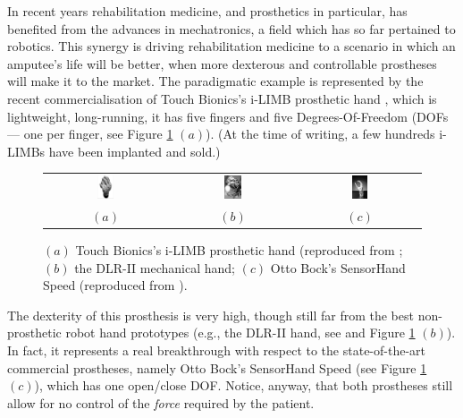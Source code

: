In recent years rehabilitation medicine, and prosthetics in
particular, has benefited from the advances in mechatronics, a field
which has so far pertained to robotics. This synergy is driving
rehabilitation medicine to a scenario in which an amputee's life will
be better, when more dexterous and controllable prostheses will make
it to the market. The paradigmatic example is represented by the
recent commercialisation of Touch Bionics's i-LIMB prosthetic hand
\cite{ilimb}, which is lightweight, long-running, it has five fingers
and five Degrees-Of-Freedom (DOFs --- one per finger, see Figure
\ref{fig:hands} $(a)$). (At the time of writing, a few hundreds i-LIMBs
have been implanted and sold.)

\begin{figure}
  \begin{tabular}{ccc}
    \includegraphics[width=0.14\textwidth]{hands_TB.eps} &
    \includegraphics[width=0.14\textwidth]{hands_DLRII.eps} &
    \includegraphics[width=0.14\textwidth]{hands_OB.eps} \\
    $(a)$ & $(b)$ & $(c)$
  \end{tabular}
  \caption{$(a)$ Touch Bionics's i-LIMB prosthetic hand (reproduced
    from \cite{ilimb}; $(b)$ the DLR-II mechanical hand; $(c)$ Otto
    Bock's SensorHand Speed (reproduced from \cite{sensorhand}).}
  \label{fig:hands}
\end{figure}

The dexterity of this prosthesis is very high, though still far from
the best non-prosthetic robot hand prototypes (e.g., the DLR-II hand,
see \cite{Hua2006} and Figure \ref{fig:hands} $(b)$). In fact, it
represents a real breakthrough with respect to the state-of-the-art
commercial prostheses, namely Otto Bock's SensorHand Speed (see Figure
\ref{fig:hands} $(c)$), which has one open/close DOF. Notice, anyway,
that both prostheses still allow for no control of the \emph{force}
required by the patient.

